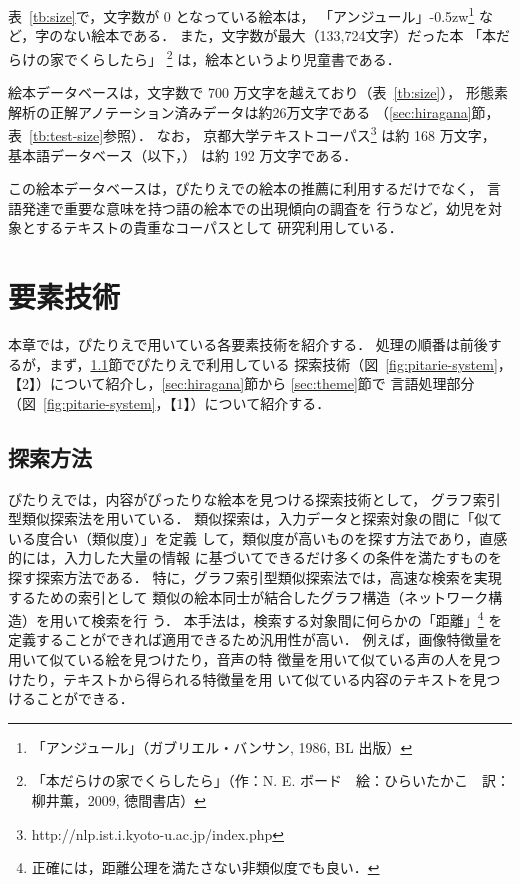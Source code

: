 \documentclass[japanese]{jnlp_1.4}
\newcommand{\lxd}{}
\begin{document}
表~\ref{tb:size}で，文字数が 0 となっている絵本は，
「アンジュール」{\kern-0.5zw}\footnote{「アンジュール」（ガブリエル・バンサン, 1986, BL 出版）} など，字のない絵本である．
また，文字数が最大（133,724文字）だった本
「本だらけの家でくらしたら」
\footnote{「本だらけの家でくらしたら」（作：N. E. ボード　絵：ひらいたかこ　訳：柳井薫，2009, 徳間書店）}
は，絵本というより児童書である．

絵本データベースは，文字数で
700 万文字を越えており（表~\ref{tb:size}），
形態素解析の正解アノテーション済みデータは約26万文字である
（\ref{sec:hiragana}節，表~\ref{tb:test-size}参照）．
なお，
京都大学テキストコーパス\footnote{http://nlp.ist.i.kyoto-u.ac.jp/index.php} は約 168 万文字，
基本語データベース\cite{Lexeed:2004j}（以下，\lxd{}）
は約 192 万文字である．


この絵本データベースは，ぴたりえでの絵本の推薦に利用するだけでなく，
言語発達で重要な意味を持つ語の絵本での出現傾向の調査を
行う\cite{Okumura:Kobayashi:Fujita:Hattori:2016}など，幼児を対象とするテキストの貴重なコーパスとして
研究利用している．


\section{要素技術}\label{sec:nlp}

本章では，ぴたりえで用いている各要素技術を紹介する．
処理の順番は前後するが，まず，\ref{sec:search}節でぴたりえで利用している
探索技術（図~\ref{fig:pitarie-system}，【2】）について紹介し，\ref{sec:hiragana}節から \ref{sec:theme}節で
言語処理部分（図~\ref{fig:pitarie-system}，【1】）について紹介する．


\subsection{探索方法}\label{sec:search}

ぴたりえでは，内容がぴったりな絵本を見つける探索技術として，
グラフ索引型類似探索法\cite{Hattori:Aoyama:2013j}を用いている．
類似探索は，入力データと探索対象の間に「似ている度合い（類似度）」を定義
して，類似度が高いものを探す方法であり，直感的には，入力した大量の情報
に基づいてできるだけ多くの条件を満たすものを探す探索方法である．
特に，グラフ索引型類似探索法では，高速な検索を実現するための索引として
類似の絵本同士が結合したグラフ構造（ネットワーク構造）を用いて検索を行
う．
本手法は，検索する対象間に何らかの「距離」\footnote{正確には，距離公理を満たさない非類似度でも良い．} を定義することができれば適用できるため汎用性が高い．
例えば，画像特徴量を用いて似ている絵を見つけたり，音声の特
徴量を用いて似ている声の人を見つけたり，テキストから得られる特徴量を用
いて似ている内容のテキストを見つけることができる．
\end{document}
